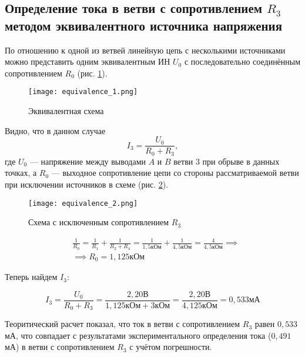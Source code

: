 \subsection{Определение тока в ветви с сопротивлением $R_3$ методом
  эквивалентного источника напряжения}

По отношению к одной из ветвей линейную цепь с несколькими
источниками можно представить одним эквивалентным ИН $U_0$ с
последовательно соединённым сопротивлением $R_0$ (рис. \ref*{fig:equivalence_1}).

\begin{figure}[!h]
  \centering
  \texttt{[image: equivalence\_1.png]}
  \caption{Эквивалентная схема}
  \label{fig:equivalence_1}
\end{figure}

Видно, что в данном случае
$$I_3 = \frac{U_0}{R_0 + R_3},$$
где $U_0$ — напряжение между выводами $A$ и $B$ ветви $3$ при обрыве
в данных точках, а $R_0$ — выходное сопротивление цепи со стороны
рассматриваемой ветви при исключении источников в схеме (рис. \ref*{fig:equivalence_2}).

\begin{figure}[!h]
  \centering
  \texttt{[image: equivalence\_2.png]}
  \caption{Схема с исключенным сопротивлением $R_3$}
  \label{fig:equivalence_2}
\end{figure}

\begin{equation}
  \begin{aligned}
     & \frac{1}{R_0}=\frac{1}{R_1}+\frac{1}{R_2+R_4}=\frac{1}{1,5 \text{кОм}} + \frac{1}{4,5 \text{кОм}} =\frac{4}{4,5 \text{кОм}}  \implies \\
     & \implies R_0=1,125 \text{кОм}
  \end{aligned}
\end{equation}

Теперь найдем $I_3$:

\begin{equation}
  I_3 = \frac{U_0}{R_0 + R_3} = \frac{2,20 \text{В}}{1,125 \text{кОм} + 3 \text{кОм}} = \frac{2,20 \text{В}}{4,125 \text{кОм}} = 0,533 \text{мА}
\end{equation}

Теоритический расчет показал, что ток в ветви с сопротивлением $R_3$
равен $0,533$ мА, что совпадает с результатами экспериментального
определения тока ($0,491$ мА) в ветви с сопротивлением $R_3$ с учётом погрешности.